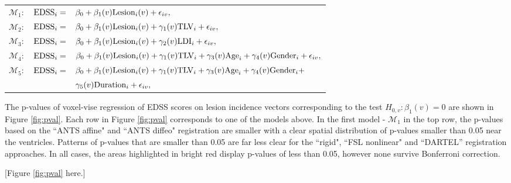 \documentclass[10pt]{article}
\begin{document}
\vspace{0.1in}
\begin{tabular}{rll}
\noindent $\mathcal{M}_1:$ & $ {\rm EDSS}_i =$ & \hspace{-0.18in} $\beta_0+\beta_1(v) {\rm Lesion}_i(v) + \epsilon_{iv}, $\\
$\mathcal{M}_2:$ & $ {\rm EDSS}_i = $ & \hspace{-0.18in} $ \beta_0+\beta_1(v) {\rm Lesion}_i(v) + \gamma_1(v){\rm TLV}_i + \epsilon_{iv}, $\\
$\mathcal{M}_3:$ & $ {\rm EDSS}_i = $ & \hspace{-0.18in} $ \beta_0+\beta_1(v) {\rm Lesion}_i(v) + \gamma_2(v){\rm LDI}_i + \epsilon_{iv}, $\\
$\mathcal{M}_4:$ &$  {\rm EDSS}_i = $ & \hspace{-0.18in} $ \beta_0+\beta_1(v) {\rm Lesion}_i(v) + \gamma_1(v){\rm TLV}_i  +\gamma_3(v){\rm Age}_i+\gamma_4(v) {\rm Gender}_i + \epsilon_{iv},$ \\
$\mathcal{M}_5:$ &$  {\rm EDSS}_i = $ & \hspace{-0.18in} $ \beta_0+\beta_1(v) {\rm Lesion}_i(v)  + \gamma_1(v){\rm TLV}_i +\gamma_3(v){\rm Age}_i + \gamma_4 (v) {\rm Gender}_i + $ \\
&&\hspace{-0.18in} $ \gamma_5 (v) {\rm Duration}_i  + \epsilon_{iv},$ \\
\end{tabular}
\vspace{0.1in}

The p-values of voxel-vise regression of EDSS scores on lesion
incidence vectors corresponding to the test $H_{0,v}:\beta_1(v)=0$
are shown in Figure \ref{fig:pval}. Each row in Figure
\ref{fig:pval} corresponds to one of the models above. In the first
model - $\mathcal{M}_1$ in the top row, the p-values based on the ``ANTS
affine" and ``ANTS diffeo" registration are smaller with a clear
spatial distribution of p-values smaller than 0.05 near the ventricles. Patterns of p-values that are smaller than 0.05 are far less
clear for the ``rigid", ``FSL nonlinear" and ``DARTEL'' registration approaches.
In all cases, the  areas highlighted in bright red display p-values of
less than 0.05, however none survive Bonferroni correction. 

[Figure \ref{fig:pval} here.]
\end{document}
